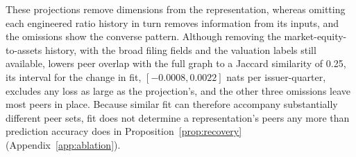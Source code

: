 These projections remove dimensions from the representation, whereas
omitting each engineered ratio history in turn removes information from its
inputs, and the omissions show the converse pattern. Although removing the
market-equity-to-assets history, with the broad filing fields and the
valuation labels still available, lowers peer overlap with the full graph
to a Jaccard similarity of 0.25, its interval for the change in fit,
$[-0.0008, 0.0022]$ nats per issuer-quarter, excludes any loss as large as
the projection's, and the other three omissions leave most peers in place.
Because similar fit can therefore accompany substantially different peer
sets, fit does not determine a representation's peers any more than
prediction accuracy does in Proposition~\ref{prop:recovery}
(Appendix~\ref{app:ablation}).
